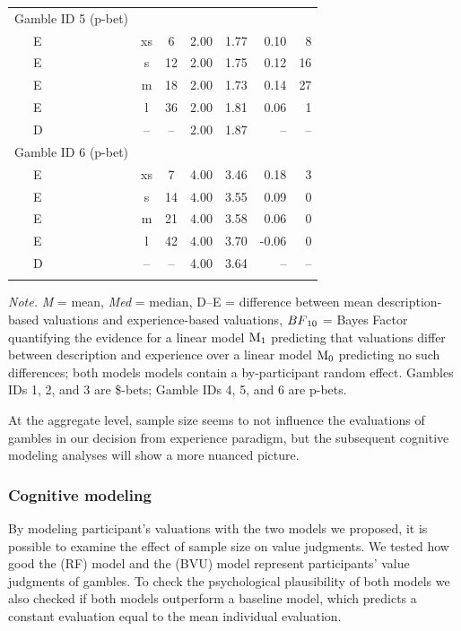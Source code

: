 \documentclass[
  a4paper, man, floatsintext]{apa6}
\begin{document}
\begin{table}[tbp]
\begin{center}
\begin{threeparttable}
\begin{tabular}{lccccrr}
Gamble ID 5 (p-bet) &  &  &  &  &  & \\
\ \ \ E & xs & 6 & 2.00 & 1.77 & 0.10 & 8\\
\ \ \ E & s & 12 & 2.00 & 1.75 & 0.12 & 16\\
\ \ \ E & m & 18 & 2.00 & 1.73 & 0.14 & 27\\
\ \ \ E & l & 36 & 2.00 & 1.81 & 0.06 & 1\\
\ \ \ D & -- & -- & 2.00 & 1.87 & -- & --\\
Gamble ID 6 (p-bet) &  &  &  &  &  & \\
\ \ \ E & xs & 7 & 4.00 & 3.46 & 0.18 & 3\\
\ \ \ E & s & 14 & 4.00 & 3.55 & 0.09 & 0\\
\ \ \ E & m & 21 & 4.00 & 3.58 & 0.06 & 0\\
\ \ \ E & l & 42 & 4.00 & 3.70 & -0.06 & 0\\
\ \ \ D & -- & -- & 4.00 & 3.64 & -- & --\\
\bottomrule
\addlinespace
\end{tabular}

\begin{tablenotes}[para]
\normalsize{\textit{Note.} \textit{M} = mean, \textit{Med} = median, D--E = difference between mean description-based valuations and experience-based valuations, $BF\textsubscript{10}$ = Bayes Factor quantifying the evidence for a linear model $\mathrm{M}\textsubscript{1}$ predicting that valuations differ between description and experience over a linear model $\mathrm{M}\textsubscript{0}$ predicting no such differences; both models models contain a by-participant random effect. Gambles IDs 1, 2, and 3 are \$-bets; Gamble IDs 4, 5, and 6 are p-bets.}
\end{tablenotes}

\end{threeparttable}
\end{center}

\end{table}

At the aggregate level, sample size seems to not influence the
evaluations of gambles in our decision from experience paradigm, but the
subsequent cognitive modeling analyses will show a more nuanced picture.

\subsubsection{Cognitive modeling}

By modeling participant's valuations with the two models we proposed, it
is possible to examine the effect of sample size on value judgments. We
tested how good the  (RF) model and the
 (BVU) model represent
participants' value judgments of gambles. To check the psychological
plausibility of both models we also checked if both models outperform a
baseline model, which predicts a constant evaluation equal to the mean
individual evaluation.
\end{document}
